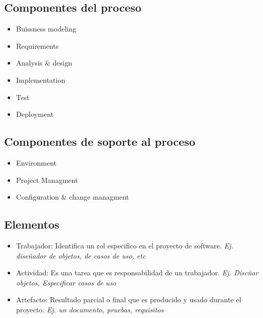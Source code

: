 \documentclass[titlepage,a4paper]{article}
\begin{document}
\subsection*{Componentes del proceso}
\begin{itemize}
    \item Buissness modeling
    \item Requirements
    \item Analysis \& design
    \item Implementation
    \item Test
    \item Deployment
\end{itemize}

\subsection*{Componentes de soporte al proceso}
\begin{itemize}
    \item Environment
    \item Project Managment
    \item Configuration \& change managment
\end{itemize}


\subsection*{Elementos}

\begin{itemize}
    \item Trabajador: Identifica un rol especifico en el proyecto de software. \textit{Ej. diseñador de objetos, de casos de uso, etc}
    \item Actividad: Es una tarea que es responsabilidad de un trabajador. \textit{Ej. Diseñar objetos, Especificar casos de uso}
    \item Artefacto: Resultado parcial o final que es producido y usado durante el proyecto. \textit{Ej. un documento, pruebas, requisitos}
\end{itemize}

\newpage
\end{document}
